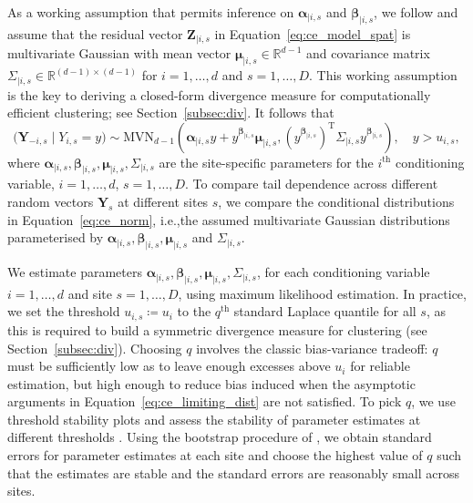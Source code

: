 \documentclass[12pt,compact]{article}
\newcommand{\mvmean}[1]{\symbf{\alpha}_{\mid i, #1} y + y^{\symbf{\beta}_{\mid i, #1}} \symbf{\mu}_{\mid i, #1}}
\newcommand{\mvcov}[1]{\left(y^{\symbf{\beta}_{\mid i, #1}}\right)^{\mathrm{T}} \Sigma_{\mid i, #1} y^{\symbf{\beta}_{\mid i, #1}}}
\begin{document}
As a working assumption that permits inference on $\symbf{\alpha}_{\mid i, s}$ and $\symbf{\beta}_{\mid i, s}$, we follow \citet{Heffernan2004} and assume that the residual vector $\symbf{Z}_{\mid i, s}$ in Equation~\eqref{eq:ce_model_spat} is multivariate Gaussian with mean vector $\symbf{\mu}_{\mid i, s} \in\mathbb{R}^{d-1}$ and covariance matrix $\Sigma_{\mid i, s}\in\mathbb{R}^{(d-1)\times(d-1)}$ for $i = 1, \ldots, d$ and $s = 1, \ldots, D$.
This working assumption is the key to deriving a closed-form divergence measure for computationally efficient clustering; see Section~\ref{subsec:div}.
It follows that 
\begin{equation}\label{eq:ce_norm}
  \bigl(\symbf{Y}_{-i, s} \mid Y_{i, s} = y\bigr) \sim \mbox{MVN}_{d-1}\left(\mvmean{s}, \mvcov{s}\right),\quad y > u_{i, s},
\end{equation}
where $\symbf{\alpha}_{\mid i, s}, \symbf{\beta}_{\mid i, s}, \symbf{\mu}_{\mid i, s}, \Sigma_{\mid i, s}$ are the site-specific parameters for the $i^{\text{th}}$ conditioning variable, $i = 1, \ldots, d$, $s = 1, \ldots, D$.
To compare tail dependence across different random vectors $\symbf{Y}_{s}$ at different sites $s$, we compare the conditional distributions in Equation~\eqref{eq:ce_norm}, i.e.,\@ the assumed multivariate Gaussian distributions parameterised by $\symbf{\alpha}_{\mid i, s},\symbf{\beta}_{\mid i, s},\symbf{\mu}_{\mid i, s}$ and $\Sigma_{\mid i, s}$.

We estimate parameters $\symbf{\alpha}_{\mid i, s}, \symbf{\beta}_{\mid i, s}, \symbf{\mu}_{\mid i, s}, \Sigma_{\mid i, s}$, for each conditioning variable $i = 1, \ldots, d$ and site $s = 1, \ldots, D$, using maximum likelihood estimation.
In practice, we set the threshold $u_{i, s} \coloneqq u_i$ to the $q^{\text{th}}$ standard Laplace quantile for all $s$, as this is required to build a symmetric divergence measure for clustering (see Section~\ref{subsec:div}).
Choosing $q$ involves the classic bias-variance tradeoff: $q$ must be sufficiently low as to leave enough excesses above $u_i$ for reliable estimation, but high enough to reduce bias induced when the asymptotic arguments in Equation~\eqref{eq:ce_limiting_dist} are not satisfied. 
To pick $q$, we use threshold stability plots and assess the stability of parameter estimates at different thresholds \citep{Southworth2012}. 
Using the bootstrap procedure of \citet{Heffernan2004}, we obtain standard errors for parameter estimates at each site and choose the highest value of $q$ such that the estimates are stable and the standard errors are reasonably small across sites. 
\end{document}
